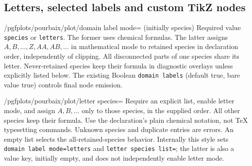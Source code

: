 \documentclass[a4paper,11pt]{ltxdoc}
\begin{document}
\subsection{Letters, selected labels and custom TikZ nodes}
\begin{key}{/pgfplots/pourbaix/plot/domain label mode= (initially species)}
Required value \texttt{species} or \texttt{letters}. The former uses chemical
formulas. The latter assigns $A,B,\ldots,Z,AA,AB,\ldots$ in mathematical mode to
retained species in declaration order, independently of clipping. All disconnected
parts of one species share its letter. Never-retained species keep their formula
in diagnostic overlays unless explicitly listed below. The existing Boolean
\texttt{domain labels} (default true, bare value true) controls final node emission.
\end{key}
\begin{key}{/pgfplots/pourbaix/plot/letter species=}
Require an explicit list, enable letter mode, and assign $A,B,\ldots$ only to
those species, in the supplied order. All other species keep their formula.
Use the declaration's plain chemical notation, not TeX typesetting commands.
Unknown species and duplicate entries are errors. An empty list selects the
all-retained-species behavior. Internally this style sets \texttt{domain label
mode=letters} and \texttt{letter species list=}; the latter is also a
value key, initially empty, and does not independently enable letter mode.
\end{key}
\end{document}
